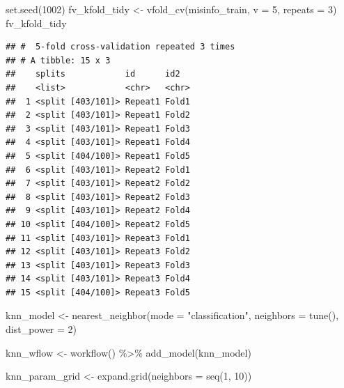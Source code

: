 \documentclass[
]{article}
\newenvironment{Shaded}{\begin{snugshade}}{\end{snugshade}}
\newcommand{\AttributeTok}[1]{\textcolor[rgb]{0.77,0.63,0.00}{#1}}
\newcommand{\DecValTok}[1]{\textcolor[rgb]{0.00,0.00,0.81}{#1}}
\newcommand{\FunctionTok}[1]{\textcolor[rgb]{0.00,0.00,0.00}{#1}}
\newcommand{\NormalTok}[1]{#1}
\newcommand{\OtherTok}[1]{\textcolor[rgb]{0.56,0.35,0.01}{#1}}
\newcommand{\SpecialCharTok}[1]{\textcolor[rgb]{0.00,0.00,0.00}{#1}}
\newcommand{\StringTok}[1]{\textcolor[rgb]{0.31,0.60,0.02}{#1}}
\begin{document}
\begin{Shaded}
\begin{Highlighting}[]
\FunctionTok{set.seed}\NormalTok{(}\DecValTok{1002}\NormalTok{)}
\NormalTok{fv\_kfold\_tidy }\OtherTok{\textless{}{-}} \FunctionTok{vfold\_cv}\NormalTok{(misinfo\_train, }\AttributeTok{v =} \DecValTok{5}\NormalTok{, }\AttributeTok{repeats =} \DecValTok{3}\NormalTok{)}
\NormalTok{fv\_kfold\_tidy}
\end{Highlighting}
\end{Shaded}

\begin{verbatim}
## #  5-fold cross-validation repeated 3 times 
## # A tibble: 15 x 3
##    splits            id      id2  
##    <list>            <chr>   <chr>
##  1 <split [403/101]> Repeat1 Fold1
##  2 <split [403/101]> Repeat1 Fold2
##  3 <split [403/101]> Repeat1 Fold3
##  4 <split [403/101]> Repeat1 Fold4
##  5 <split [404/100]> Repeat1 Fold5
##  6 <split [403/101]> Repeat2 Fold1
##  7 <split [403/101]> Repeat2 Fold2
##  8 <split [403/101]> Repeat2 Fold3
##  9 <split [403/101]> Repeat2 Fold4
## 10 <split [404/100]> Repeat2 Fold5
## 11 <split [403/101]> Repeat3 Fold1
## 12 <split [403/101]> Repeat3 Fold2
## 13 <split [403/101]> Repeat3 Fold3
## 14 <split [403/101]> Repeat3 Fold4
## 15 <split [404/100]> Repeat3 Fold5
\end{verbatim}

\begin{Shaded}
\begin{Highlighting}[]
\NormalTok{knn\_model }\OtherTok{\textless{}{-}} \FunctionTok{nearest\_neighbor}\NormalTok{(}\AttributeTok{mode =} \StringTok{"classification"}\NormalTok{, }\AttributeTok{neighbors =} \FunctionTok{tune}\NormalTok{(), }\AttributeTok{dist\_power =} \DecValTok{2}\NormalTok{)}

\NormalTok{knn\_wflow }\OtherTok{\textless{}{-}} \FunctionTok{workflow}\NormalTok{() }\SpecialCharTok{\%\textgreater{}\%}
  \FunctionTok{add\_model}\NormalTok{(knn\_model)}
\end{Highlighting}
\end{Shaded}

\begin{Shaded}
\begin{Highlighting}[]
\NormalTok{knn\_param\_grid }\OtherTok{\textless{}{-}} \FunctionTok{expand.grid}\NormalTok{(}\AttributeTok{neighbors =} \FunctionTok{seq}\NormalTok{(}\DecValTok{1}\NormalTok{, }\DecValTok{10}\NormalTok{))}
\end{Highlighting}
\end{Shaded}
\end{document}
